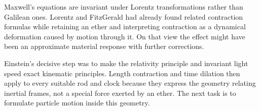 \begin{classroomqa}
\end{classroomqa}

Maxwell's equations are invariant under Lorentz transformations rather than Galilean ones. Lorentz and FitzGerald had already found related contraction formulas while retaining an ether and interpreting contraction as a dynamical deformation caused by motion through it. On that view the effect might have been an approximate material response with further corrections.

Einstein's decisive step was to make the relativity principle and invariant light speed exact kinematic principles. Length contraction and time dilation then apply to every suitable rod and clock because they express the geometry relating inertial frames, not a special force exerted by an ether. The next task is to formulate particle motion inside this geometry.
